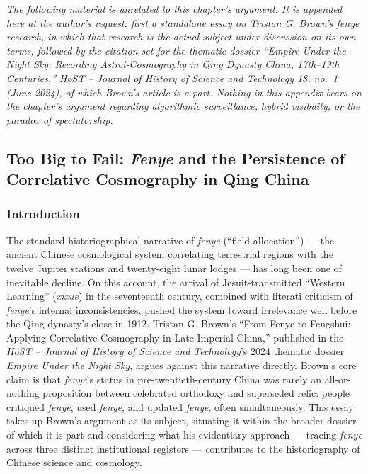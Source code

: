 \documentclass[10pt]{article}
\begin{document}
\textit{The following material is unrelated to this chapter's argument. It is appended here at the author's request: first a standalone essay on Tristan G. Brown's \emph{fenye} research, in which that research is the actual subject under discussion on its own terms, followed by the citation set for the thematic dossier ``Empire Under the Night Sky: Recording Astral-Cosmography in Qing Dynasty China, 17th--19th Centuries,'' \emph{HoST -- Journal of History of Science and Technology} 18, no.\ 1 (June 2024), of which Brown's article is a part. Nothing in this appendix bears on the chapter's argument regarding algorithmic surveillance, hybrid visibility, or the paradox of spectatorship.}

\subsection*{Too Big to Fail: \emph{Fenye} and the Persistence of Correlative Cosmography in Qing China}

\subsubsection*{Introduction}

The standard historiographical narrative of \emph{fenye} (``field allocation'') --- the ancient Chinese cosmological system correlating terrestrial regions with the twelve Jupiter stations and twenty-eight lunar lodges --- has long been one of inevitable decline. On this account, the arrival of Jesuit-transmitted ``Western Learning'' (\emph{xixue}) in the seventeenth century, combined with literati criticism of \emph{fenye}'s internal inconsistencies, pushed the system toward irrelevance well before the Qing dynasty's close in 1912. Tristan G. Brown's ``From Fenye to Fengshui: Applying Correlative Cosmography in Late Imperial China,'' published in the \emph{HoST -- Journal of History of Science and Technology}'s 2024 thematic dossier \emph{Empire Under the Night Sky}, argues against this narrative directly. Brown's core claim is that \emph{fenye}'s status in pre-twentieth-century China was rarely an all-or-nothing proposition between celebrated orthodoxy and superseded relic: people critiqued \emph{fenye}, used \emph{fenye}, and updated \emph{fenye}, often simultaneously. This essay takes up Brown's argument as its subject, situating it within the broader dossier of which it is part and considering what his evidentiary approach --- tracing \emph{fenye} across three distinct institutional registers --- contributes to the historiography of Chinese science and cosmology.
\end{document}
